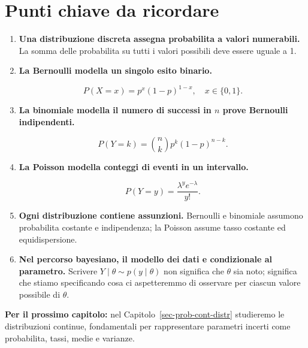 \documentclass[
  italian,
  letterpaper,
  a4paper,
  11pt,
  open=any]{scrbook}
\theoremstyle{plain}
\theoremstyle{definition}
\theoremstyle{definition}
\theoremstyle{remark}
\begin{document}
\section*{Punti chiave da ricordare}\label{punti-chiave-da-ricordare-10}


\begin{tcolorbox}[enhanced jigsaw, arc=.35mm, bottomrule=.15mm, bottomtitle=1mm, breakable, colback=white, colbacktitle=quarto-callout-important-color!10!white, colframe=quarto-callout-important-color-frame, coltitle=black, left=2mm, leftrule=.75mm, opacityback=0, opacitybacktitle=0.6, rightrule=.15mm, title=\textcolor{quarto-callout-important-color}{\faExclamation}\hspace{0.5em}{Importante}, titlerule=0mm, toprule=.15mm, toptitle=1mm]

\begin{enumerate}
\def\labelenumi{\arabic{enumi}.}
\item
  \textbf{Una distribuzione discreta assegna probabilita a valori
  numerabili.} La somma delle probabilita su tutti i valori possibili
  deve essere uguale a 1.
\item
  \textbf{La Bernoulli modella un singolo esito binario.}

  \[
  P(X=x)=p^x(1-p)^{1-x}, \quad x\in\{0,1\}.
  \]
\item
  \textbf{La binomiale modella il numero di successi in \(n\) prove
  Bernoulli indipendenti.}

  \[
  P(Y=k)=\binom{n}{k}p^k(1-p)^{n-k}.
  \]
\item
  \textbf{La Poisson modella conteggi di eventi in un intervallo.}

  \[
  P(Y=y)=\frac{\lambda^y e^{-\lambda}}{y!}.
  \]
\item
  \textbf{Ogni distribuzione contiene assunzioni.} Bernoulli e binomiale
  assumono probabilita costante e indipendenza; la Poisson assume tasso
  costante ed equidispersione.
\item
  \textbf{Nel percorso bayesiano, il modello dei dati e condizionale al
  parametro.} Scrivere \(Y \mid \theta \sim p(y\mid\theta)\) non
  significa che \(\theta\) sia noto; significa che stiamo specificando
  cosa ci aspetteremmo di osservare per ciascun valore possibile di
  \(\theta\).
\end{enumerate}

\textbf{Per il prossimo capitolo:} nel
Capitolo~\ref{sec-prob-cont-distr} studieremo le distribuzioni continue,
fondamentali per rappresentare parametri incerti come probabilita,
tassi, medie e varianze.

\end{tcolorbox}
\end{document}
